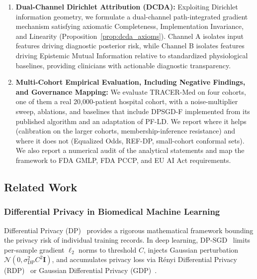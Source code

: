 \documentclass[pdflatex,sn-vancouver-num,referee,lineno]{sn-jnl}
\theoremstyle{thmstyleone}
\theoremstyle{thmstylethree}
\begin{document}
\begin{enumerate}
    \item \textbf{Dual-Channel Dirichlet Attribution (DCDA):} Exploiting Dirichlet information geometry, we formulate a dual-channel path-integrated gradient mechanism satisfying axiomatic Completeness, Implementation Invariance, and Linearity (Proposition~\ref{prop:dcda_axioms}). Channel A isolates input features driving diagnostic posterior risk, while Channel B isolates features driving Epistemic Mutual Information relative to standardized physiological baselines, providing clinicians with actionable diagnostic transparency.
    \item \textbf{Multi-Cohort Empirical Evaluation, Including Negative Findings, and Governance Mapping:} We evaluate TRACER-Med on four cohorts, one of them a real 20,000-patient hospital cohort, with a noise-multiplier sweep, ablations, and baselines that include DPSGD-F implemented from its published algorithm and an adaptation of PF-LD. We report where it helps (calibration on the larger cohorts, membership-inference resistance) and where it does not (Equalized Odds, REF-DP, small-cohort conformal sets). We also report a numerical audit of the analytical statements and map the framework to FDA GMLP, FDA PCCP, and EU AI Act requirements.
\end{enumerate}

\subsection{Related Work}
\label{sec:related}

\subsubsection{Differential Privacy in Biomedical Machine Learning}
Differential Privacy (DP)~\cite{dwork2014algorithmic} provides a rigorous mathematical framework bounding the privacy risk of individual training records. In deep learning, DP-SGD~\cite{abadi2016deep} limits per-sample gradient $\ell_2$ norms to threshold $C$, injects Gaussian perturbation $\mathcal{N}(0, \sigma_{\text{DP}}^2 C^2 \mathbf{I})$, and accumulates privacy loss via Rényi Differential Privacy (RDP)~\cite{mironov2017renyi,mironov2019renyi} or Gaussian Differential Privacy (GDP)~\cite{dong2022gaussian}.
\end{document}
